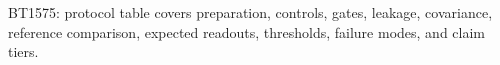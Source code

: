 \begin{center}\small
BT1575: protocol table covers preparation, controls, gates, leakage, covariance, reference comparison, expected readouts, thresholds, failure modes, and claim tiers.
\end{center}
